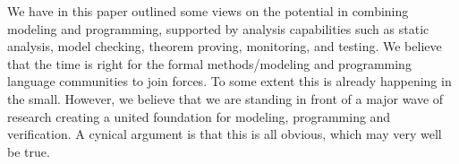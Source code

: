 We have in this paper outlined some views on the potential in 
combining modeling and programming, supported by analysis 
capabilities such as static analysis, model checking, theorem 
proving, monitoring, and testing. We believe that the time is right 
for the formal methods/modeling and programming language 
communities to join forces. To some extent this is already 
happening in the small. However, we believe that we are standing in 
front of a major wave of research creating a united foundation for 
modeling, programming and verification. A cynical argument is that 
this is all obvious, which may very well be true. 